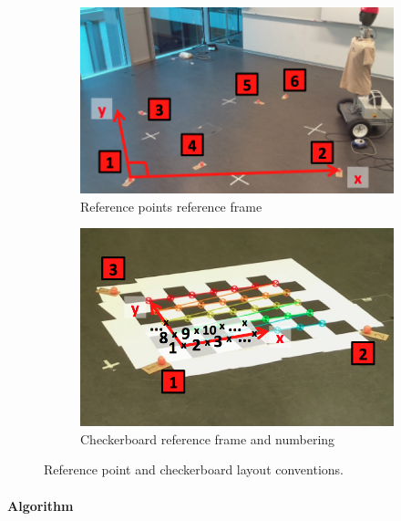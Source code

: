\begin{figure}[htb]
	\centering
	\begin{subfigure}[b]{0.49\linewidth}
        \centering
		\includegraphics[height=0.6\linewidth]{files/ref_points.png}
		\caption{Reference points reference frame}
        \label{fig:ref_points}
	\end{subfigure}
	\begin{subfigure}[b]{0.49\linewidth}
        \centering
		\includegraphics[height=0.6\linewidth]{files/ref_checkerboard.png}
		\caption{Checkerboard reference frame and numbering}
		\label{fig:ref_checkerboard.png}
	\end{subfigure}
	\caption{Reference point and checkerboard layout conventions.} 
\end{figure}

\paragraph{Algorithm}

